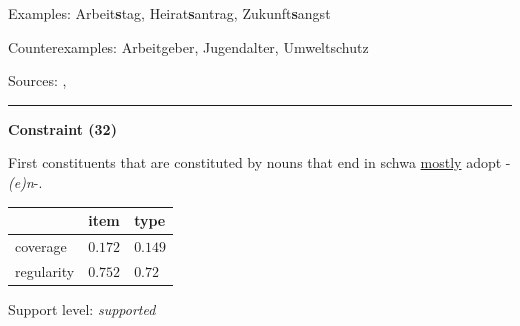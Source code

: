 \noindent
Examples: Arbeit\textbf{s}tag, Heirat\textbf{s}antrag, Zukunft\textbf{s}angst

\noindent
Counterexamples: Arbeit{\zeroLinker}geber, Jugend{\zeroLinker}alter, Umwelt{\zeroLinker}schutz

\vspace{0.3em}

\noindent
Sources: \citet[77]{nuebling_szczepaniak_2013}, \citet[74, 75]{ortner_mueller-bollhagen_1991}


\hrule




\vspace{0.4em}

\begin{center}
\textbf{Constraint (32)}
\end{center}

\noindent
First constituents that are constituted by nouns that end in schwa \underline{mostly} adopt -\textit{(e)n}-.
\vspace{0.35em}


\vspace{-0.35em}

\begin{table}[!ht]
\begin{center}

\begin{tabularx}{\columnwidth}{|X|X|X|}
\hline
 & item & type \\
\hline
 coverage & $0.172$ & $0.149$ \\
\hline
 regularity & $0.752$ & $0.72$ \\
\hline
\end{tabularx}
\end{center}
\end{table}

\vspace{-1.35em}

\noindent
Support level: \textit{supported}

